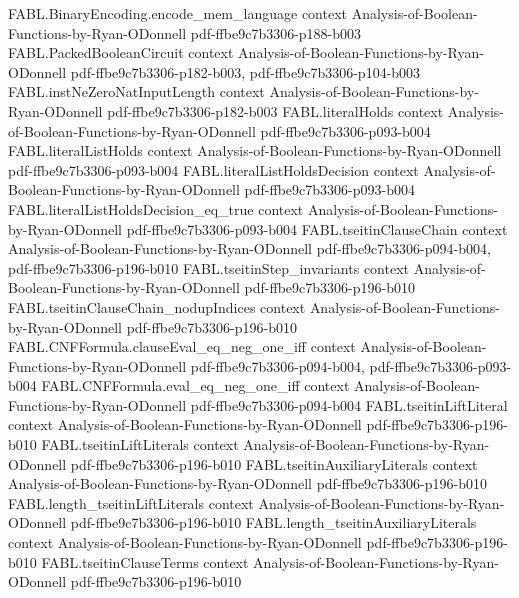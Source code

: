 \begin{theorem}
\proofstep
  {FABL.BinaryEncoding.encode_mem_language}
  {context}
  {Analysis-of-Boolean-Functions-by-Ryan-ODonnell}
  {pdf-ffbe9c7b3306-p188-b003}
\proofstep
  {FABL.PackedBooleanCircuit}
  {context}
  {Analysis-of-Boolean-Functions-by-Ryan-ODonnell}
  {pdf-ffbe9c7b3306-p182-b003,
    pdf-ffbe9c7b3306-p104-b003}
\proofstep
  {FABL.instNeZeroNatInputLength}
  {context}
  {Analysis-of-Boolean-Functions-by-Ryan-ODonnell}
  {pdf-ffbe9c7b3306-p182-b003}
\proofstep
  {FABL.literalHolds}
  {context}
  {Analysis-of-Boolean-Functions-by-Ryan-ODonnell}
  {pdf-ffbe9c7b3306-p093-b004}
\proofstep
  {FABL.literalListHolds}
  {context}
  {Analysis-of-Boolean-Functions-by-Ryan-ODonnell}
  {pdf-ffbe9c7b3306-p093-b004}
\proofstep
  {FABL.literalListHoldsDecision}
  {context}
  {Analysis-of-Boolean-Functions-by-Ryan-ODonnell}
  {pdf-ffbe9c7b3306-p093-b004}
\proofstep
  {FABL.literalListHoldsDecision_eq_true}
  {context}
  {Analysis-of-Boolean-Functions-by-Ryan-ODonnell}
  {pdf-ffbe9c7b3306-p093-b004}
\proofstep
  {FABL.tseitinClauseChain}
  {context}
  {Analysis-of-Boolean-Functions-by-Ryan-ODonnell}
  {pdf-ffbe9c7b3306-p094-b004,
    pdf-ffbe9c7b3306-p196-b010}
\proofstep
  {FABL.tseitinStep_invariants}
  {context}
  {Analysis-of-Boolean-Functions-by-Ryan-ODonnell}
  {pdf-ffbe9c7b3306-p196-b010}
\proofstep
  {FABL.tseitinClauseChain_nodupIndices}
  {context}
  {Analysis-of-Boolean-Functions-by-Ryan-ODonnell}
  {pdf-ffbe9c7b3306-p196-b010}
\proofstep
  {FABL.CNFFormula.clauseEval_eq_neg_one_iff}
  {context}
  {Analysis-of-Boolean-Functions-by-Ryan-ODonnell}
  {pdf-ffbe9c7b3306-p094-b004,
    pdf-ffbe9c7b3306-p093-b004}
\proofstep
  {FABL.CNFFormula.eval_eq_neg_one_iff}
  {context}
  {Analysis-of-Boolean-Functions-by-Ryan-ODonnell}
  {pdf-ffbe9c7b3306-p094-b004}
\proofstep
  {FABL.tseitinLiftLiteral}
  {context}
  {Analysis-of-Boolean-Functions-by-Ryan-ODonnell}
  {pdf-ffbe9c7b3306-p196-b010}
\proofstep
  {FABL.tseitinLiftLiterals}
  {context}
  {Analysis-of-Boolean-Functions-by-Ryan-ODonnell}
  {pdf-ffbe9c7b3306-p196-b010}
\proofstep
  {FABL.tseitinAuxiliaryLiterals}
  {context}
  {Analysis-of-Boolean-Functions-by-Ryan-ODonnell}
  {pdf-ffbe9c7b3306-p196-b010}
\proofstep
  {FABL.length_tseitinLiftLiterals}
  {context}
  {Analysis-of-Boolean-Functions-by-Ryan-ODonnell}
  {pdf-ffbe9c7b3306-p196-b010}
\proofstep
  {FABL.length_tseitinAuxiliaryLiterals}
  {context}
  {Analysis-of-Boolean-Functions-by-Ryan-ODonnell}
  {pdf-ffbe9c7b3306-p196-b010}
\proofstep
  {FABL.tseitinClauseTerms}
  {context}
  {Analysis-of-Boolean-Functions-by-Ryan-ODonnell}
  {pdf-ffbe9c7b3306-p196-b010}

\end{theorem}
